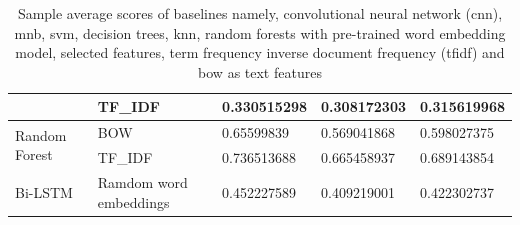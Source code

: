 \begin{table}[h!]
{\begin{tabular}{@{}lllll@{}}
\multicolumn{1}{|l|}{} &
  \multicolumn{1}{l|}{TF\_IDF} &
  \multicolumn{1}{l|}{0.330515298} &
  \multicolumn{1}{l|}{0.308172303} &
  \multicolumn{1}{l|}{0.315619968} \\ \midrule
\multicolumn{1}{|l|}{\multirow{2}{*}{Random Forest}} &
  \multicolumn{1}{l|}{BOW} &
  \multicolumn{1}{l|}{0.65599839} &
  \multicolumn{1}{l|}{0.569041868} &
  \multicolumn{1}{l|}{0.598027375} \\ \cmidrule(l){2-5} 
\multicolumn{1}{|l|}{} &
  \multicolumn{1}{l|}{TF\_IDF} &
  \multicolumn{1}{l|}{0.736513688} &
  \multicolumn{1}{l|}{0.665458937} &
  \multicolumn{1}{l|}{0.689143854} \\ \midrule
\multicolumn{1}{|l|}{Bi-LSTM} &
  \multicolumn{1}{l|}{Ramdom word embeddings} &
  \multicolumn{1}{l|}{0.452227589} &
  \multicolumn{1}{l|}{0.409219001} &
  \multicolumn{1}{l|}{0.422302737} \\ \bottomrule
\end{tabular}%
}

\caption{Sample average scores of baselines namely, convolutional neural network (\acrshort{cnn}), \acrfull{mnb}, \acrfull{svm}, decision trees, \acrfull{knn}, random forests with pre-trained word embedding model, selected features, term frequency inverse document frequency (\acrshort{tfidf}) and \acrfull{bow} as text features}
\label{tab:Sample average scores baselines}
\end{table}

